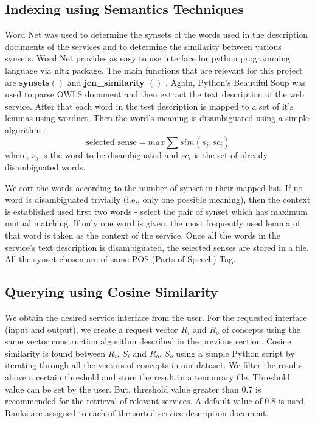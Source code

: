 \documentclass[12pt, oneside]{book}
\begin{document}
\subsection{Indexing using Semantics Techniques}
Word Net \cite{wordnet} was used to determine the synsets of the words used in the description documents of the services and to determine the similarity between various synsets. Word Net provides as easy to use interface for python programming language via nltk package. The main functions that are relevant for this project are \textbf{synsets$\left( \right)$} and \textbf{jcn\_similarity $\left( \right)$ }. Again, Python's Beautiful Soup was used to parse OWLS document and then extract the text description of the web service. After that each word in the test description is mapped to a set of it's lemmas using wordnet. Then the word's meaning is disambiguated using a simple algorithm :
\begin{equation}
 \text{selected sense} = max \sum sim(s_{j}, sc_{i})
\end{equation}
where, $s_{j}$ is the word to be disambiguated and $sc_{i}$ is the set of already disambiguated words. \\ \par
We sort the words according to the number of synset in their mapped list. If no word is disambiguated trivially (i.e., only one possible meaning), then the context is established used first two words - select the pair of synset which has maximum mutual matching. If only one word is given, the most frequently used lemma of that word is taken as the context of the service. Once all the words in the service's text description is disambiguated, the selected senses are stored in a file. All the synset chosen are of same POS (Parts of Speech) Tag.

\subsection{Querying using Cosine Similarity}
We obtain the desired service interface from the user. For the requested interface (input and output), we create a request vector $R_i$ and $R_{o}$ of concepts using the same vector construction algorithm described in the previous section. Cosine similarity is found between $R_{i}$, $S_{i}$ and $R_{o}$, $S_{o}$ using a simple Python script by iterating through all the vectors of concepts in our dataset. We filter the results above a certain threshold and store the result in a temporary file.  Threshold value can be set by the user. But, threshold value greater than 0.7 is recommended for the retrieval of relevant services. A default value of 0.8 is used. Ranks are assigned to each of the sorted service description document.
\end{document}
